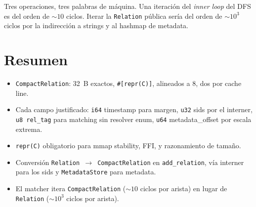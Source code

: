 \noindent
Tres operaciones, tres palabras de máquina. Una iteración del
\emph{inner loop} del DFS es del orden de \(\sim 10\) ciclos.
Iterar la \texttt{Relation} pública sería del orden de \(\sim
10^3\) ciclos por la indirección a strings y al hashmap de
metadata.

\section{Resumen}

\begin{itemize}
    \item \texttt{CompactRelation}: 32~B exactos,
    \texttt{\#[repr(C)]}, alineados a 8, dos por cache line.
    \item Cada campo justificado: \texttt{i64} timestamp para
    margen, \texttt{u32} sids por el interner, \texttt{u8 rel\_tag}
    para matching sin resolver enum, \texttt{u64} metadata\_offset
    por escala extrema.
    \item \texttt{repr(C)} obligatorio para mmap stability, FFI, y
    razonamiento de tamaño.
    \item Conversión \texttt{Relation $\to$ CompactRelation} en
    \texttt{add\_relation}, vía interner para los sids y
    \texttt{MetadataStore} para metadata.
    \item El matcher itera \texttt{CompactRelation} (\(\sim 10\)
    ciclos por arista) en lugar de \texttt{Relation} (\(\sim 10^3\)
    ciclos por arista).
\end{itemize}

